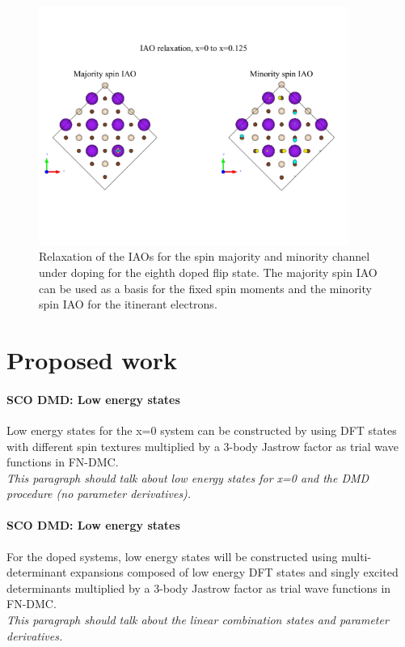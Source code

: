 \documentclass{article}
\begin{document}
\begin{figure}[H]
\centering
\includegraphics[width=0.9\textwidth]{Figures/R3-iao_basis.pdf}
\caption{\label{fig5} Relaxation of the IAOs for the spin majority and minority channel under doping for the eighth doped flip state. The majority spin IAO can be used as a basis for the fixed spin moments and the minority spin IAO for the itinerant electrons.}
\end{figure}
\pagebreak

\section{Proposed work}
\paragraph{SCO DMD: Low energy states} Low energy states for the x=0 system can be constructed by using DFT states with different spin textures multiplied by a 3-body Jastrow factor as trial wave functions in FN-DMC.
\\
\textit{This paragraph should talk about low energy states for x=0 and the DMD procedure (no parameter derivatives).}

\paragraph{SCO DMD: Low energy states} For the doped systems, low energy states will be constructed using multi-determinant expansions composed of low energy DFT states and singly excited determinants multiplied by a 3-body Jastrow factor as trial wave functions in FN-DMC.
\\
\textit{This paragraph should talk about the linear combination states and parameter derivatives.}
\end{document}
